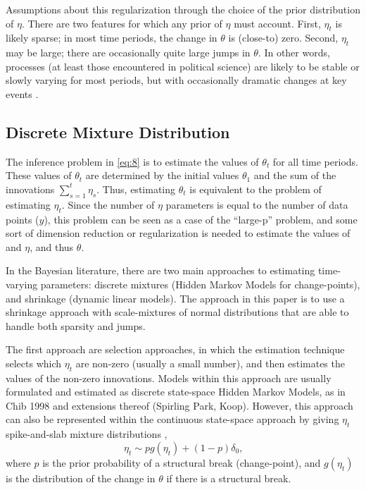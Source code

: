 \documentclass{article}
\begin{document}
Assumptions about this regularization through the choice of the prior distribution of $\eta$.
There are two features for which any prior of $\eta$ must account.
First, $\eta_{t}$ is likely sparse; in most time periods, the change in $\theta$ is (close-to) zero.
Second, $\eta_{t}$ may be large; there are occasionally quite large jumps in $\theta$.
In other words, processes (at least those encountered in political science) are likely to be stable or slowly varying for most periods, but with occasionally dramatic changes at key events \parencite{RatkovicEng2010}.

\subsection{Discrete Mixture Distribution}
\label{sec:discr-mixt-distr}

The inference problem in \eqref{eq:8} is to estimate the values of $\theta_{t}$ for all time periods.
These values of $\theta_{t}$ are determined by the initial values $\theta_{1}$ and the sum of the innovations $\sum_{s=1}^{t} \eta_{s}$.
Thus, estimating $\theta_{t}$ is equivalent to the problem of estimating $\eta_{t}$.
Since the number of $\eta$ parameters is equal to the number of data points ($y$), this problem can be seen as a case of the ``large-p'' problem, and some sort of dimension reduction or regularization is needed to estimate the values of and $\eta$, and thus $\theta$.

In the Bayesian literature, there are two main approaches to estimating time-varying parameters: discrete mixtures (Hidden Markov Models for change-points), and shrinkage (dynamic linear models).
The approach in this paper is to use a shrinkage approach with scale-mixtures of normal distributions that are able to handle both sparsity and jumps.

The first approach are selection approaches, in which the estimation technique selects which $\eta_{t}$ are non-zero (usually a small number), and then estimates the values of the non-zero innovations.
Models within this approach are usually formulated and estimated as discrete state-space Hidden Markov Models, as in Chib 1998 and extensions thereof (Spirling Park, Koop).
However, this approach can also be represented within the continuous state-space approach by giving $\eta_{t}$ spike-and-slab mixture distributions \parencite{GiordaniKohn2008},
\begin{equation}
  \label{eq:1}
  \eta_{t} \sim p g(\eta_{t}) + (1 - p) \delta_{0} \text{,}
\end{equation}
where $p$ is the prior probability of a structural break (change-point), and $g(\eta_{t})$ is the distribution of the change in $\theta$ if there is a structural break.
\end{document}
